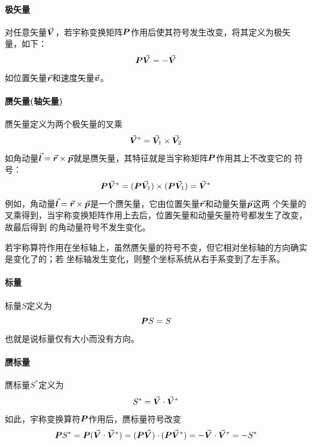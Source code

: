\paragraph*{极矢量}
对任意矢量$\vec{\bm{V}}$，若宇称变换矩阵$\bm{P}$作用后使其符号发生改变，将其定义为极矢量，如下：
\begin{equation}
    \bm{P} \vec{\bm{V}} = -\vec{\bm{V}}
    \label{eq:polar-vector}
\end{equation}
如位置矢量$\vec{\bm{r}}$和速度矢量$\vec{\bm{v}}$。

\paragraph*{赝矢量(轴矢量)}
赝矢量定义为两个极矢量的叉乘
\begin{equation}
    \vec{\bm{V}}^{\ast} = \vec{\bm{V}}_1 \times \vec{\bm{V}}_2
    \label{eq:pesudovectors-def}
\end{equation}
如角动量$\vec{\bm{l}} = \vec{\bm{r}} \times \vec{\bm{p}}$就是赝矢量，其特征就是当宇称矩阵$\bm{P}$作用其上不改变它的
符号：
\begin{equation}
    \bm{P} \vec{\bm{V}}^{\ast} = (\bm{P} \vec{\bm{V}}_1) \times (\bm{P} \vec{\bm{V}}_1) = \vec{\bm{V}}^{\ast}
    \label{eq:pesudovec-parity}
\end{equation}
例如，角动量$\vec{\bm{l}} = \vec{\bm{r}} \times \vec{\bm{p}}$是一个赝矢量，它由位置矢量$\vec{\bm{r}}$和动量矢量$\vec{\bm{p}}$这两
个矢量的叉乘得到，当宇称变换矩阵作用上去后，位置矢量和动量矢量符号都发生了改变，故最后得到
的角动量符号不发生变化。
\begin{note}
    若宇称算符作用在坐标轴上，虽然赝矢量的符号不变，但它相对坐标轴的方向确实是变化了的；若
    坐标轴发生变化，则整个坐标系统从右手系变到了左手系。
\end{note}

\paragraph*{标量}
标量$S$定义为
\begin{equation}
    \bm{P} S = S
    \label{eq:scalar-def}
\end{equation}
也就是说标量仅有大小而没有方向。

\paragraph*{赝标量}
赝标量$S^{\ast}$定义为
\begin{equation}
    S^{\ast} = \vec{\bm{V}} \cdot \vec{\bm{V}}^{\ast}
    \label{eq:pseudoscalar-def}
\end{equation}
如此，宇称变换算符$\bm{P}$作用后，赝标量符号改变
\begin{equation}
    \bm{P} S^{\ast} = \bm{P} (\vec{\bm{V}} \cdot \vec{\bm{V}}^{\ast}) = (\bm{P} \vec{\bm{V}}) \cdot (\bm{P}\vec{\bm{V}}^{\ast})
                  = -\vec{\bm{V}} \cdot \vec{\bm{V}}^{\ast} = -S^{\ast}
    \label{eq:pseudoscalar-prop1}
\end{equation}


